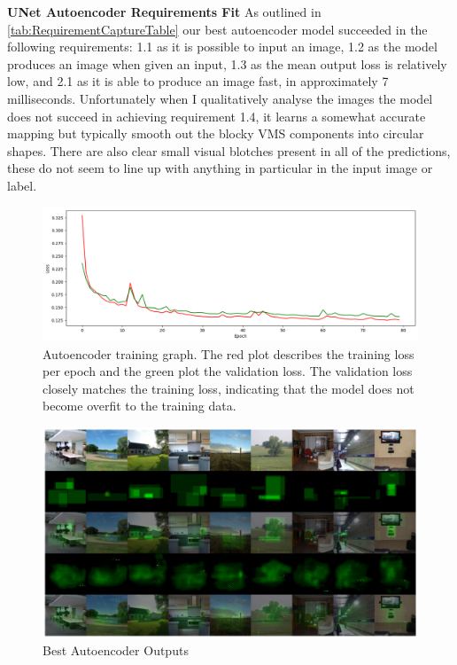 \documentclass{UoYCSproject}
\begin{document}
\textbf{UNet Autoencoder Requirements Fit}
As outlined in \ref{tab:RequirementCaptureTable} our best autoencoder model succeeded in the following requirements: 1.1 as it is possible to input an image, 1.2 as the model produces an image when given an input, 1.3 as the mean output loss is relatively low, and 2.1 as it is able to produce an image fast, in approximately 7 milliseconds.
Unfortunately when I qualitatively analyse the images the model does not succeed in achieving requirement 1.4, it learns a somewhat accurate mapping but typically smooth out the blocky VMS components into circular shapes. There are also clear small visual blotches present in all of the predictions, these do not seem to line up with anything in particular in the input image or label.   

\begin{figure}[ht]
    \centering
    \includegraphics[width=\linewidth]{Autoencoder Training Curve}
    \caption{Autoencoder training graph. The red plot describes the training loss per epoch and the green plot the validation loss. The validation loss closely matches the training loss, indicating that the model does not become overfit to the training data.}
    \label{fig:autoencoderTraining}
\end{figure}

\begin{figure}[ht]
    \centering
    \includegraphics[width=\linewidth]{Best autoencoder Outputs}
    \caption{Best Autoencoder Outputs}
    \label{fig:autoencoderBestOutput}
\end{figure}
\end{document}
